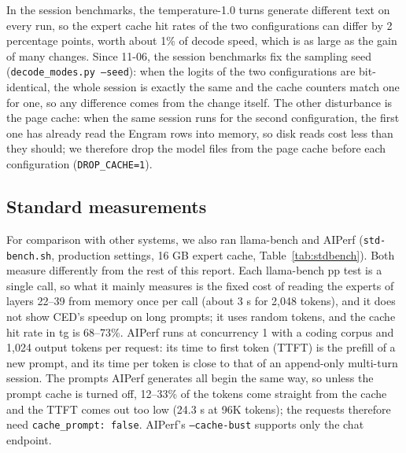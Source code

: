\documentclass[11pt,a4paper]{article}
\newcommand{\code}[1]{\texttt{#1}}
\begin{document}
In the session benchmarks, the temperature-1.0 turns generate different text on every run, so the expert cache hit rates of the two configurations can differ by 2 percentage points, worth about 1\% of decode speed, which is as large as the gain of many changes. Since 11-06, the session benchmarks fix the sampling seed (\code{decode\_modes.py --seed}): when the logits of the two configurations are bit-identical, the whole session is exactly the same and the cache counters match one for one, so any difference comes from the change itself. The other disturbance is the page cache: when the same session runs for the second configuration, the first one has already read the Engram rows into memory, so disk reads cost less than they should; we therefore drop the model files from the page cache before each configuration (\code{DROP\_CACHE=1}).

\subsection{Standard measurements}
\label{sec:stdbench}

For comparison with other systems, we also ran llama-bench and AIPerf (\code{std-bench.sh}, production settings, 16 GB expert cache, Table~\ref{tab:stdbench}). Both measure differently from the rest of this report. Each llama-bench pp test is a single call, so what it mainly measures is the fixed cost of reading the experts of layers 22--39 from memory once per call (about 3 s for 2,048 tokens), and it does not show CED's speedup on long prompts; it uses random tokens, and the cache hit rate in tg is 68--73\%. AIPerf runs at concurrency 1 with a coding corpus and 1,024 output tokens per request: its time to first token (TTFT) is the prefill of a new prompt, and its time per token is close to that of an append-only multi-turn session. The prompts AIPerf generates all begin the same way, so unless the prompt cache is turned off, 12--33\% of the tokens come straight from the cache and the TTFT comes out too low (24.3 s at 96K tokens); the requests therefore need \code{cache\_prompt: false}. AIPerf's \code{--cache-bust} supports only the chat endpoint.
\end{document}
